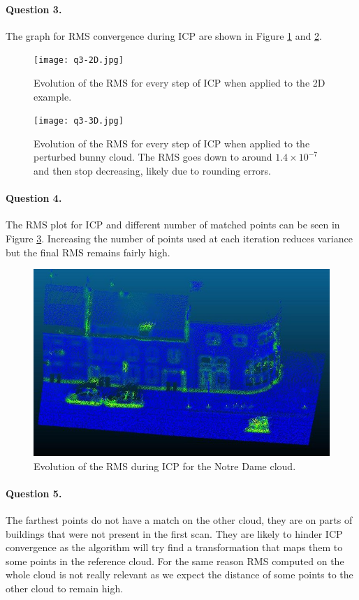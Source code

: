 \documentclass[french]{article}
\begin{document}
\paragraph{Question 3.}
The graph for RMS convergence during ICP are shown in Figure \ref{fig:q3-2d} and \ref{fig:q3-3d}.

\begin{figure}[h]
	\centering
	\texttt{[image: q3-2D.jpg]}
	\caption{Evolution of the RMS for every step of ICP when applied to the 2D example.}
	\label{fig:q3-2d}
\end{figure}

\begin{figure}[h]
	\centering
	\texttt{[image: q3-3D.jpg]}
	\caption{Evolution of the RMS for every step of ICP when applied to the perturbed bunny cloud. The RMS goes down to around $1.4\times  10^{-7}$ and then stop decreasing, likely due to rounding errors.}
	\label{fig:q3-3d}
\end{figure}

\paragraph{Question 4.}
The RMS plot for ICP and different number of matched points can be seen in Figure \ref{fig:q4}. Increasing the number of points used at each iteration reduces variance but the final RMS remains fairly high.

\begin{figure}[h]
	\centering
	\includegraphics[width=0.6\linewidth]{q4.jpg}
	\caption{Evolution of the RMS during ICP for the Notre Dame cloud.}
	\label{fig:q4}
\end{figure}

\paragraph{Question 5.}
The farthest points do not have a match on the other  cloud, they are on parts of buildings that were not present in the first scan. They are likely to hinder ICP convergence as the algorithm will try find a transformation that maps them to some points in the reference cloud. For the same reason RMS computed on the whole cloud is not really relevant as we expect the distance of some points to the other cloud to remain high.
\end{document}
